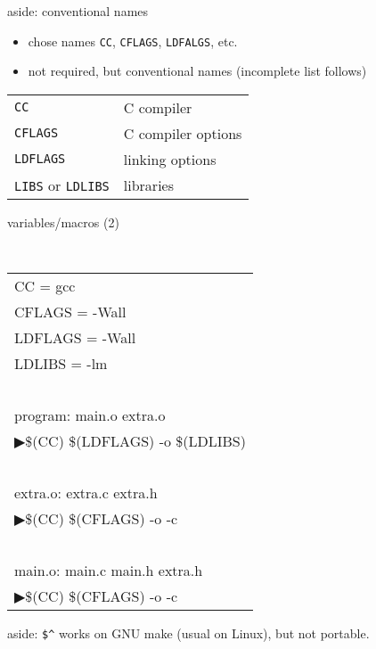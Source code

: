 \begin{frame}{aside: conventional names}
\begin{itemize}
\item chose names \texttt{CC}, \texttt{CFLAGS}, \texttt{LDFALGS}, etc.
\item not required, but conventional names (incomplete list follows)
\end{itemize}
\begin{tabular}{ll}
\texttt{CC} & C compiler \\
\texttt{CFLAGS} & C compiler options \\
\texttt{LDFLAGS} & linking options \\
\texttt{LIBS} or \texttt{LDLIBS} & libraries \\
\end{tabular}
\end{frame}

\begin{frame}{variables/macros (2)}

{\tt
\begin{tabular}{l}
CC = gcc \\
CFLAGS = -Wall \\
LDFLAGS = -Wall \\
LDLIBS = -lm \\
~ \\
program: main.o extra.o \\
▶\hspace{1.5cm}\$(CC) \$(LDFLAGS) -o \myemph{\$@} \myemph{\$\textasciicircum} \$(LDLIBS) \\
~ \\
extra.o: extra.c extra.h \\
▶\hspace{1.5cm}\$(CC) \$(CFLAGS) -o \myemph{\$@} -c \myemph{\$<} \\
~ \\
main.o: main.c main.h extra.h \\
▶\hspace{1.5cm}\$(CC) \$(CFLAGS) -o \myemph{\$@} -c \myemph{\$<} \\
\end{tabular}
}

{\small aside: \texttt{\$\textasciicircum} works on GNU make (usual on Linux), but not portable.}
\end{frame}

